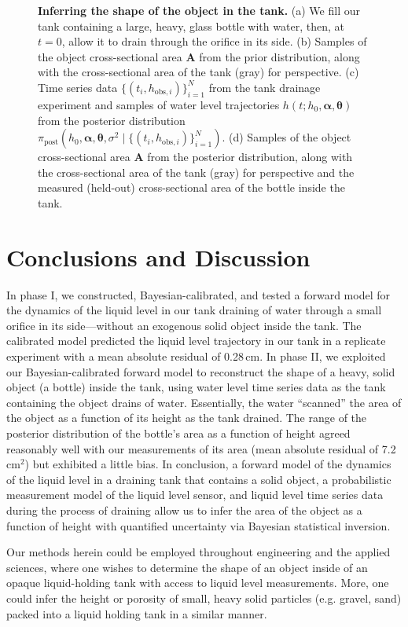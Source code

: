 \documentclass[openacc]{rsproca_new}%
\newcommand\thedata {$\{(t_i,h_{\text{obs}, i})\}_{i=1}^{N}$\xspace}
\newcommand\thedatanomath {\{(t_i,h_{\text{obs}, i})\}_{i=1}^{N}}
\newcommand\themodel {$h(t; h_0, \boldsymbol \alpha, \boldsymbol\theta)$\xspace}
\newcommand\thevars{h_0, \boldsymbol \alpha, \boldsymbol \theta, \sigma^2}
\begin{document}
\begin{figure}[h!]
    \caption{
      \textbf{Inferring the shape of the object in the tank.} 
      (a) We fill our tank containing a large, heavy, glass bottle with water, then, at $t=0$, allow it to drain through the orifice in its side.
      (b) Samples of the object cross-sectional area $\mathbf{A}$ from the prior distribution, along with the cross-sectional area of the tank (gray) for perspective. 
      (c) Time series data \thedata from the tank drainage experiment and samples of water level trajectories \themodel from the posterior distribution $\pi_{\text{post}}(\thevars \mid \thedatanomath)$.
      (d) Samples of the object cross-sectional area $\mathbf{A}$ from the posterior distribution, along with the cross-sectional area of the tank (gray) for perspective and the measured (held-out) cross-sectional area of the bottle inside the tank. 
      }
\end{figure}

\section{Conclusions and Discussion}
In phase I, we constructed, Bayesian-calibrated, and tested a forward model for the dynamics of the liquid level in our tank draining of water through a small orifice in its side---without an exogenous solid object inside the tank.
The calibrated model predicted the liquid level trajectory in our tank in a replicate experiment with a mean absolute residual of 0.28\,cm.
In phase II, we exploited our Bayesian-calibrated forward model to reconstruct the shape of a heavy, solid object (a bottle) inside the tank, using water level time series data as the tank containing the object drains of water. Essentially, the water ``scanned'' the area of the object as a function of its height as the tank drained. 
The range of the posterior distribution of the bottle's area as a function of height agreed reasonably well with our measurements of its area (mean absolute residual of 7.2\,cm$^2$) but exhibited a little bias. 
In conclusion, a forward model of the dynamics of the liquid level in a draining tank that contains a solid object, a probabilistic measurement model of the liquid level sensor, and liquid level time series data during the process of draining allow us to infer the area of the object as a function of height with quantified uncertainty via Bayesian statistical inversion. 

Our methods herein could be employed throughout engineering and the applied sciences, where one wishes to determine the shape of an object inside of an opaque liquid-holding tank with access to liquid level measurements.
More, one could infer the height or porosity of small, heavy solid particles (e.g. gravel, sand) packed into a liquid holding tank in a similar manner. 
\end{document}
